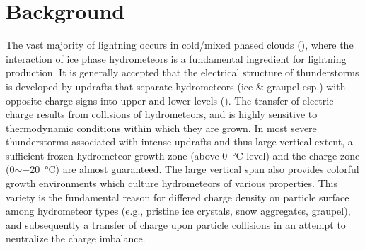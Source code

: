  
\chapter{Background}
\resetfootnote %

The vast majority of lightning occurs in cold/mixed phased clouds (\cite{wallace2006atmospheric}), where the interaction of ice phase hydrometeors is a fundamental ingredient for lightning production. It is generally accepted that the electrical structure of thunderstorms is developed by updrafts that separate hydrometeors (ice \& graupel esp.) with opposite charge signs into upper and lower levels (\cite{saunders2008charge}). The transfer of electric charge results from collisions of hydrometeors, and is highly sensitive to thermodynamic conditions within which they are grown. In most severe thunderstorms associated with intense updrafts and thus large vertical extent, a sufficient frozen hydrometeor growth zone (above \SI{0}{\celsius} level) and the charge zone (0$\sim$\SI{-20}{\celsius}) are almost guaranteed. The large vertical span also provides colorful growth environments which culture hydrometeors of various properties. This variety is the fundamental reason for differed charge density on particle surface among hydrometeor types (e.g., pristine ice crystals, snow aggregates, graupel), and subsequently a transfer of charge upon particle collisions in an attempt to neutralize the charge imbalance. 

